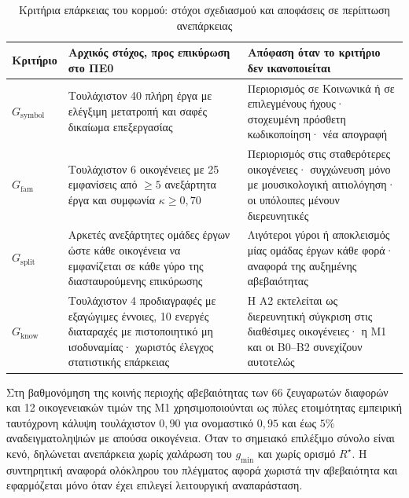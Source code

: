 \documentclass[a4paper]{article}
\newcommand{\Rs}{\ensuremath{R^{\star}}}
\begin{document}
\begin{table}[htbp]
\caption{Κριτήρια επάρκειας του κορμού: στόχοι σχεδιασμού και αποφάσεις σε περίπτωση ανεπάρκειας}\label{tab:gates}
\footnotesize
\begin{tabularx}{\linewidth}{@{}L{1.3cm}YL{4.6cm}@{}}
\toprule
\textbf{Κριτήριο} & \textbf{Αρχικός στόχος, προς επικύρωση στο ΠΕ0} & \textbf{Απόφαση όταν το κριτήριο δεν ικανοποιείται}\\\midrule
$G_{\mathrm{symbol}}$ & Τουλάχιστον 40 πλήρη έργα με ελέγξιμη μετατροπή και σαφές δικαίωμα επεξεργασίας & Περιορισμός σε Κοινωνικά ή σε επιλεγμένους ήχους· στοχευμένη πρόσθετη κωδικοποίηση· νέα απογραφή\\
$G_{\mathrm{fam}}$ & Τουλάχιστον 6 οικογένειες με 25 εμφανίσεις από $\geq5$ ανεξάρτητα έργα και συμφωνία $\kappa\geq0{,}70$ & Περιορισμός στις σταθερότερες οικογένειες· συγχώνευση μόνο με μουσικολογική αιτιολόγηση· οι υπόλοιπες μένουν διερευνητικές\\
$G_{\mathrm{split}}$ & Αρκετές ανεξάρτητες ομάδες έργων ώστε κάθε οικογένεια να εμφανίζεται σε κάθε γύρο της διασταυρούμενης επικύρωσης & Λιγότεροι γύροι ή αποκλεισμός μίας ομάδας έργων κάθε φορά· αναφορά της αυξημένης αβεβαιότητας\\
$G_{\mathrm{know}}$ & Τουλάχιστον 4 προδιαγραφές με εξαγώγιμες έννοιες, 10 ενεργές διαταραχές με πιστοποιητικό μη ισοδυναμίας· χωριστός έλεγχος στατιστικής επάρκειας & Η Α2 εκτελείται ως διερευνητική σύγκριση στις διαθέσιμες οικογένειες· η Μ1 και οι B0--B2 συνεχίζουν αυτοτελώς\\\bottomrule
\end{tabularx}
\end{table}

Στη βαθμονόμηση της κοινής περιοχής αβεβαιότητας των 66 ζευγαρωτών διαφορών και 12 οικογενειακών τιμών της Μ1 χρησιμοποιούνται ως πύλες ετοιμότητας εμπειρική ταυτόχρονη κάλυψη τουλάχιστον $0{,}90$ για ονομαστικό $0{,}95$ και έως $5\%$ αναδειγματοληψιών με απούσα οικογένεια. Όταν το σημειακό επιλέξιμο σύνολο είναι κενό, δηλώνεται ανεπάρκεια χωρίς χαλάρωση του $g_{\min}$ και χωρίς ορισμό $\Rs$. Η συντηρητική αναφορά ολόκληρου του πλέγματος αφορά χωριστά την αβεβαιότητα και εφαρμόζεται μόνο όταν έχει επιλεγεί λειτουργική αναπαράσταση.
\end{document}
